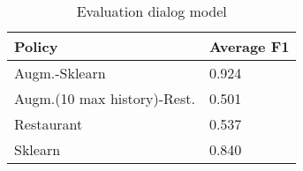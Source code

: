 \documentclass[11pt,a4paper]{article}
\begin{document}
\begin{table}[t!]
\begin{center}
\begin{tabular}{|l|l|}
\hline \bf Policy & \bf Average F1 \\ \hline
Augm.-Sklearn & 0.924 \\
Augm.(10 max history)-Rest. & 0.501 \\
Restaurant & 0.537 \\
Sklearn & 0.840 \\
\hline
\end{tabular}
\end{center}
\caption{\label{font-table} Evaluation dialog model }
\end{table}



\end{document}
